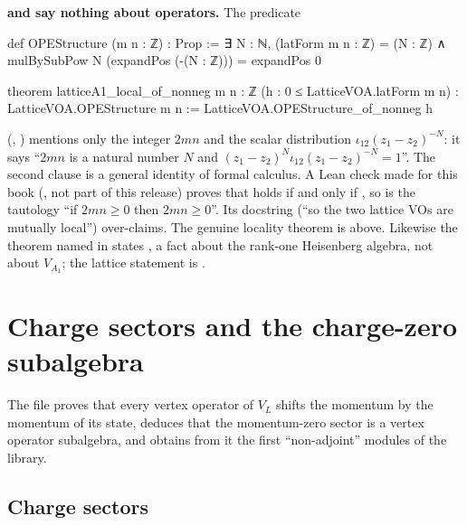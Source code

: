 \begin{warning}
\textbf{ and  say nothing about operators.} The predicate
\begin{leancode}
def OPEStructure (m n : ℤ) : Prop :=
  ∃ N : ℕ, (latForm m n : ℤ) = (N : ℤ) ∧
    mulBySubPow N (expandPos (-(N : ℤ))) = expandPos 0

theorem latticeA1_local_of_nonneg {m n : ℤ} (h : 0 ≤ LatticeVOA.latForm m n) :
    LatticeVOA.OPEStructure m n :=
  LatticeVOA.OPEStructure_of_nonneg h
\end{leancode}
(, ) mentions only the integer $2mn$ and
the scalar distribution $\iota_{12}(z_1-z_2)^{-N}$: it says ``$2mn$ is a natural number $N$ and
$(z_1-z_2)^N\iota_{12}(z_1-z_2)^{-N}=1$''. The second clause is a general identity of formal calculus. A
Lean check made for this book (, not part of this release) proves that
 holds if and only if , so  is the tautology ``if $2mn\ge0$ then $2mn\ge0$''. Its docstring (``so the two
lattice VOs are mutually local'') over-claims. The genuine locality theorem is  above.
Likewise the theorem named  in  states
, a fact about the rank-one Heisenberg algebra, not about $V_{A_1}$; the
lattice statement is .
\end{warning}

\section{Charge sectors and the charge-zero subalgebra}\label{l05:sec:charge}

The file  proves that every vertex operator of
$V_L$ shifts the momentum by the momentum of its state, deduces that the momentum-zero sector is a vertex operator
subalgebra, and obtains from it the first ``non-adjoint'' modules of the library.

\subsection{Charge sectors}

